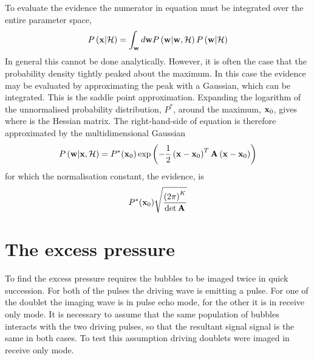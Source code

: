 To evaluate the evidence the numerator in equation  must be integrated over the entire parameter space,
\begin{align}
  P\left( \mathbf{x}|{\cal H} \right) = \int_{\mathbf{w}} d\mathbf{w} P\left( \mathbf{w}|\mathbf{w},{\cal H} \right) P\left( \mathbf{w}|{\cal H} \right)
\end{align}
In general this cannot be done analytically.
However, it is often the case that the probability density tightly peaked about the maximum.
In this case the evidence may be evaluated by approximating the peak with a Gaussian, which can be integrated.
This is the saddle point approximation.
Expanding the logarithm of the  unnormalised probability distribution, $P^\ast$, 
around the maximum, $\mathbf{x}_0$,
gives
where 
is the Hessian matrix.
The right-hand-side of equation   is therefore approximated by the multidimensional Gaussian
\begin{align}
   P\left( \mathbf{w}|\mathbf{x},{\cal H} \right) = P^\ast(\mathbf{x}_0) \exp \left( - \frac{1}{2}\left( \mathbf{x}-\mathbf{x}_0 \right)^T \textbf{A}\left( \mathbf{x}-\mathbf{x}_0  \right) \right)
\end{align}
for which the normalisation constant, the evidence, is 
\begin{align}
   P^\ast(\mathbf{x}_0) \sqrt{\frac{\left( 2\pi \right)^K}{\det \textbf{A}}}
\end{align}

\section{The excess pressure}\label{sec:exp:EP}



To find the excess pressure requires the bubbles to be imaged twice in quick succession.
For both of the pulses the driving wave is emitting a pulse.
For one of the doublet the imaging wave is in pulse echo mode, 
for the other it is in receive only mode.
It is necessary to assume that the same population of bubbles
interacts with the two driving pulses,
so that the resultant signal signal is the same in both cases.
To test this assumption driving doublets were imaged in receive only mode.



